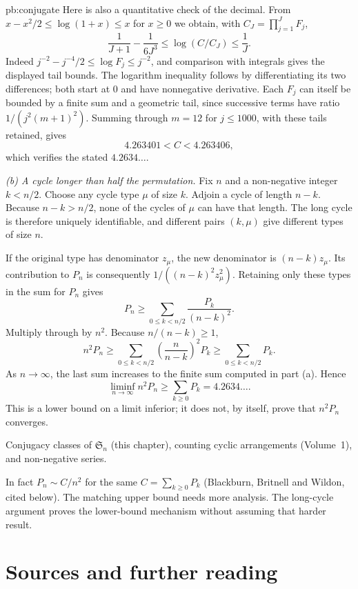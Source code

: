 \begin{solution}{pb:conjugate}
Here is also a quantitative check of the decimal. From $x-x^2/2\le\log(1+x)\le x$ for $x\ge0$ we obtain, with $C_J=\prod_{j=1}^J F_j$,
\[
\frac1{J+1}-\frac1{6J^3}
\le\log(C/C_J)\le\frac1J.
\]
Indeed $j^{-2}-j^{-4}/2\le\log F_j\le j^{-2}$, and comparison with integrals gives the displayed tail bounds. The logarithm inequality follows by differentiating its two differences; both start at $0$ and have nonnegative derivative. Each $F_j$ can itself be bounded by a finite sum and a geometric tail, since successive terms have ratio $1/(j^2(m+1)^2)$. Summing through $m=12$ for $j\le1000$, with these tails retained, gives
\[
4.263401<C<4.263406,
\]
which verifies the stated $4.2634\ldots$.

\emph{(b) A cycle longer than half the permutation.}
Fix $n$ and a non-negative integer $k<n/2$. Choose any cycle type $\mu$ of size $k$. Adjoin a cycle of length $n-k$. Because $n-k>n/2$, none of the cycles of $\mu$ can have that length. The long cycle is therefore uniquely identifiable, and different pairs $(k,\mu)$ give different types of size $n$.

If the original type has denominator $z_\mu$, the new denominator is $(n-k)z_\mu$. Its contribution to $P_n$ is consequently $1/((n-k)^2z_\mu^2)$. Retaining only these types in the sum for $P_n$ gives
\[
P_n\ge\sum_{0\le k<n/2}\frac{P_k}{(n-k)^2}.
\]
Multiply through by $n^2$. Because $n/(n-k)\ge1$,
\[
n^2P_n\ge\sum_{0\le k<n/2}
       \left(\frac{n}{n-k}\right)^2P_k
       \ge\sum_{0\le k<n/2}P_k.
\]
As $n\to\infty$, the last sum increases to the finite sum computed in part (a). Hence
\[
\boxed{\liminf_{n\to\infty}n^2P_n\ge
       \sum_{k\ge0}P_k=4.2634\ldots.}
\]
This is a lower bound on a limit inferior; it does not, by itself, prove that $n^2P_n$ converges.

\tools Conjugacy classes of $\mathfrak S_n$ (this chapter), counting cyclic arrangements (Volume~1), and non-negative series.

\leads In fact $P_n\sim C/n^2$ for the same $C=\sum_{k\ge0}P_k$ (Blackburn, Britnell and Wildon, cited below). The matching upper bound needs more analysis. The long-cycle argument proves the lower-bound mechanism without assuming that harder result.
\end{solution}

\section*{Sources and further reading}

